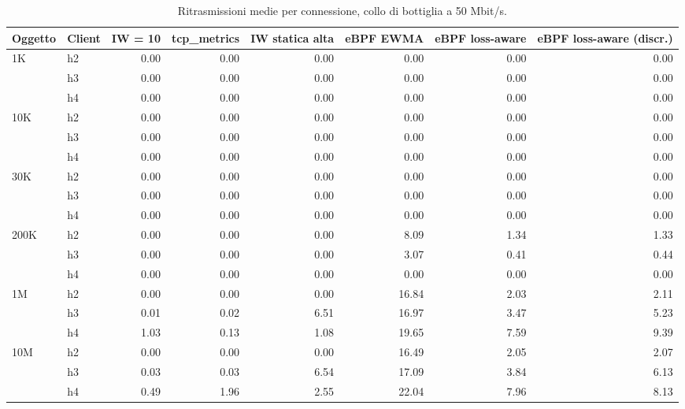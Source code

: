 \begin{table}[htbp]
  \centering
  \caption{Ritrasmissioni medie per connessione, collo di bottiglia a 50 Mbit/s.}
  \label{tab:retrans-50}
  \begin{tabular}{llrrrrrr}
    \toprule
    Oggetto & Client & IW = 10 & tcp\_metrics & IW statica alta & eBPF EWMA & eBPF loss-aware & eBPF loss-aware (discr.) \\
    \midrule
    1K & h2 & 0.00 & 0.00 & 0.00 & 0.00 & 0.00 & 0.00 \\
     & h3 & 0.00 & 0.00 & 0.00 & 0.00 & 0.00 & 0.00 \\
     & h4 & 0.00 & 0.00 & 0.00 & 0.00 & 0.00 & 0.00 \\
    \addlinespace
    10K & h2 & 0.00 & 0.00 & 0.00 & 0.00 & 0.00 & 0.00 \\
     & h3 & 0.00 & 0.00 & 0.00 & 0.00 & 0.00 & 0.00 \\
     & h4 & 0.00 & 0.00 & 0.00 & 0.00 & 0.00 & 0.00 \\
    \addlinespace
    30K & h2 & 0.00 & 0.00 & 0.00 & 0.00 & 0.00 & 0.00 \\
     & h3 & 0.00 & 0.00 & 0.00 & 0.00 & 0.00 & 0.00 \\
     & h4 & 0.00 & 0.00 & 0.00 & 0.00 & 0.00 & 0.00 \\
    \addlinespace
    200K & h2 & 0.00 & 0.00 & 0.00 & 8.09 & 1.34 & 1.33 \\
     & h3 & 0.00 & 0.00 & 0.00 & 3.07 & 0.41 & 0.44 \\
     & h4 & 0.00 & 0.00 & 0.00 & 0.00 & 0.00 & 0.00 \\
    \addlinespace
    1M & h2 & 0.00 & 0.00 & 0.00 & 16.84 & 2.03 & 2.11 \\
     & h3 & 0.01 & 0.02 & 6.51 & 16.97 & 3.47 & 5.23 \\
     & h4 & 1.03 & 0.13 & 1.08 & 19.65 & 7.59 & 9.39 \\
    \addlinespace
    10M & h2 & 0.00 & 0.00 & 0.00 & 16.49 & 2.05 & 2.07 \\
     & h3 & 0.03 & 0.03 & 6.54 & 17.09 & 3.84 & 6.13 \\
     & h4 & 0.49 & 1.96 & 2.55 & 22.04 & 7.96 & 8.13 \\
    \bottomrule
  \end{tabular}
\end{table}
